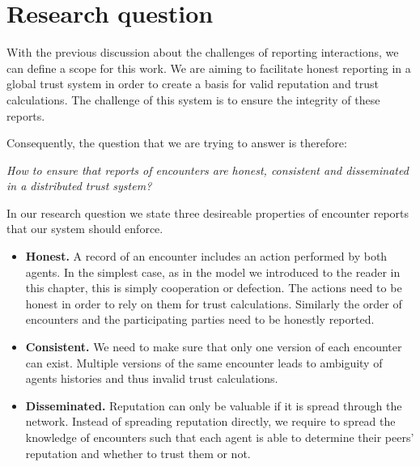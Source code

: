
\section{Research question}
With the previous discussion about the challenges of reporting interactions, we can define a scope
for this work. We are aiming to facilitate honest reporting in a global trust system in order to 
create a basis for valid reputation and trust calculations. The challenge of this system is to 
ensure the integrity of these reports. 

Consequently, the question that we are trying to answer is therefore:
\begin{center}
    \textit{How to ensure that reports of encounters are honest, consistent and disseminated in a distributed trust system?}
\end{center}



In our research question we state three desireable properties of encounter reports that our system 
should enforce.

\begin{itemize}
    \item \textbf{Honest.} A record of an encounter
    includes an action performed by both agents. In the simplest case, as in the model we introduced to
    the reader in this chapter, this is simply cooperation or defection. The actions need to be honest 
    in order to rely on them for trust calculations. Similarly the order of encounters and the participating
    parties need to be honestly reported.
    \item \textbf{Consistent.}  We need to make 
    sure that only one version of each encounter can exist. Multiple versions of the same encounter
    leads to ambiguity of agents histories and thus invalid trust calculations.
    \item \textbf{Disseminated.} Reputation can only be valuable
    if it is spread through the network. Instead of spreading reputation directly, we require to 
    spread the knowledge of encounters such that each agent is able to determine their peers' reputation
    and whether to trust them or not.
\end{itemize}

